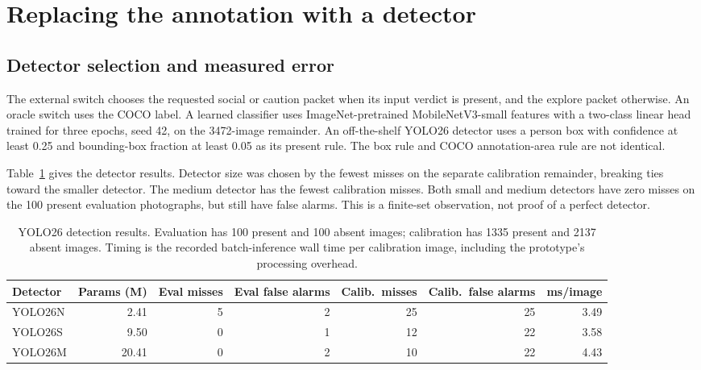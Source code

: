 \documentclass[10pt]{article}
\begin{document}
\section{Replacing the annotation with a detector}
\subsection{Detector selection and measured error}
The external switch chooses the requested social or caution packet
when its input verdict is present, and the explore packet otherwise.
An oracle switch uses the COCO label. A learned classifier uses
ImageNet-pretrained MobileNetV3-small features \citep{howard2019mobilenet}
with a two-class linear head trained for three epochs, seed 42, on
the 3472-image remainder. An off-the-shelf YOLO26 detector
\citep{ultralytics2026} uses a person box with confidence at least 0.25
and bounding-box fraction at least 0.05 as its present rule.
The box rule and COCO annotation-area rule are not identical.

Table~\ref{tab:detectors} gives the detector results. Detector size was
chosen by the fewest misses on the separate calibration remainder,
breaking ties toward the smaller detector. The medium detector has
the fewest calibration misses. Both small and medium detectors have
zero misses on the 100 present evaluation photographs, but still have
false alarms. This is a finite-set observation, not proof of a
perfect detector.

\begin{table}[htbp]\centering\small
\caption{YOLO26 detection results. Evaluation has 100 present and 100
absent images; calibration has 1335 present and 2137 absent images.
Timing is the recorded batch-inference wall time per calibration
image, including the prototype's processing overhead.}\label{tab:detectors}
\begin{tabular}{lrrrrrr}\toprule
Detector & Params (M) & Eval misses & Eval false alarms &
Calib.\ misses & Calib.\ false alarms & ms/image\\\midrule
YOLO26N & 2.41 & 5 & 2 & 25 & 25 & 3.49 \\
YOLO26S & 9.50 & 0 & 1 & 12 & 22 & 3.58 \\
YOLO26M & 20.41 & 0 & 2 & 10 & 22 & 4.43 \\

\bottomrule\end{tabular}
\end{table}
\end{document}
